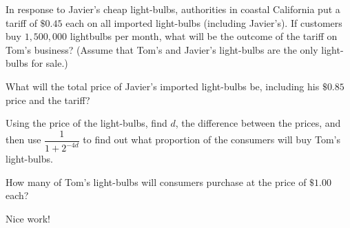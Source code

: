 \documentclass{ximera}
\begin{document}
\begin{question}
In response to Javier's cheap light-bulbs, authorities in coastal California put a tariff of $\$0.45$ each on all imported light-bulbs (including Javier's). If customers buy $1,500,000$ lightbulbs per month, what will be the outcome of the tariff on Tom's business? (Assume that Tom's and Javier's light-bulbs are the only light-bulbs for sale.)


\begin{multipleChoice}
    \end{multipleChoice}
\begin{hint}
What will the total price of Javier's imported light-bulbs be, including his $\$0.85$ price and the tariff?
\end{hint}
\begin{hint}
Using the price of the light-bulbs, find $d$, the difference between the prices, and then use $\dfrac{1}{1+2^{-4d}}$ to find out what proportion of the consumers will buy Tom's light-bulbs.
\end{hint}
\begin{hint}
How many of Tom's light-bulbs will consumers purchase at the price of $\$1.00$ each?
\end{hint}

Nice work!
\end{question}
\end{document}
